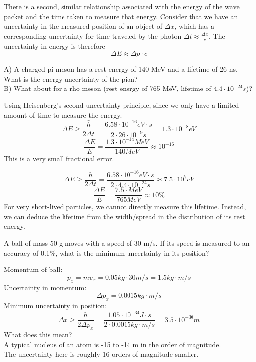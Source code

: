 \documentclass[class=article,crop=false]{standalone}
\begin{document}
There is a second, similar relationship associated with the energy of the wave packet and the time taken to measure that energy. Consider that we have an uncertainty in the measured position of an object of $\Delta x$, which has a corresponding uncertainty for time traveled by the photon $\Delta t \approx \frac{\Delta x}{c}$. The uncertainty in energy is therefore\\
$$ \Delta E \approx \Delta p \cdot c $$


\begin{question}[Example]
	A) A charged pi meson has a rest energy of 140 MeV and a lifetime of 26 ns. What is the energy uncertainty of the pion? \\
	B) What about for a rho meson (rest energy of 765 MeV, lifetime of $4.4 \cdot 10^{-24} s$)?\\

	\begin{answer}[A]
		Using Heisenberg's second uncertainty principle, since we only have a limited amount of time to measure the energy.
		$$ \Delta E \geq \frac{\bar{h}}{2\Delta t} = \frac{6.58 \cdot 10^{-16} eV \cdot s}{2 \cdot 26 \cdot 10^{-9} s} = 1.3 \cdot 10^{-8} eV $$
		$$ \frac{\Delta E}{E} = \frac{1.3 \cdot 10^{-14} MeV}{140 MeV} \approx 10^{-16} $$
		This is a very small fractional error.
	\end{answer}
	\begin{answer}[B]
		$$ \Delta E \geq \frac{\bar{h}}{2\Delta t} = \frac{6.58 \cdot 10^{-16} eV \cdot s}{2 \cdot 4.4 \cdot 10^{-24} s} \approx 7.5 \cdot 10^{7} eV $$
		$$ \frac{\Delta E}{E} = \frac{7.5 \cdot MeV}{765 MeV} \approx 10\%$$
		For very short-lived particles, we cannot directly measure this lifetime. Instead, we can deduce the lifetime from the width/spread in the distribution of its rest energy.
	\end{answer}
\end{question}

\newpage
\begin{question}[Example]
	A ball of mass 50 g moves with a speed of 30 m/s. If its speed is measured to an accuracy of 0.1\%, what is the minimum uncertainty in its position?
	\begin{answer}[Answer]
		Momentum of ball:
		$$p_x = mv_x = 0.05 kg \cdot 30 m/s = 1.5 kg \cdot m/s $$
		Uncertainty in momentum:
		$$ \Delta p_x = 0.0015 kg \cdot m/s $$
		Minimum uncertainty in position:
		$$ \Delta x \geq \frac{\bar{h}}{2\Delta p_x} = \frac{1.05 \cdot 10^{-34} J \cdot s}{2 \cdot 0.0015 kg \cdot m/s} = 3.5 \cdot 10^{-30} m $$
		What does this mean?\\
		A typical nucleus of an atom is -15 to -14 m in the order of magnitude. \\
		The uncertainty here is roughly 16 orders of magnitude smaller.
	\end{answer}
\end{question}
\end{document}
